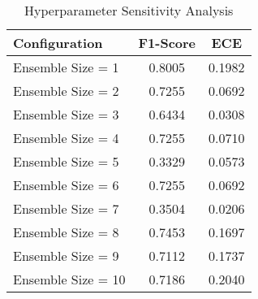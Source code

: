 \begin{table}[htbp]
\centering
\caption{Hyperparameter Sensitivity Analysis}
\label{tab:hyperparameter_sensitivity}
\begin{tabular}{l|cc}
\hline
\textbf{Configuration} & \textbf{F1-Score} & \textbf{ECE} \\
\hline
Ensemble Size = 1 & 0.8005 & 0.1982 \\
Ensemble Size = 2 & 0.7255 & 0.0692 \\
Ensemble Size = 3 & 0.6434 & 0.0308 \\
Ensemble Size = 4 & 0.7255 & 0.0710 \\
Ensemble Size = 5 & 0.3329 & 0.0573 \\
Ensemble Size = 6 & 0.7255 & 0.0692 \\
Ensemble Size = 7 & 0.3504 & 0.0206 \\
Ensemble Size = 8 & 0.7453 & 0.1697 \\
Ensemble Size = 9 & 0.7112 & 0.1737 \\
Ensemble Size = 10 & 0.7186 & 0.2040 \\
\hline
\end{tabular}
\end{table}